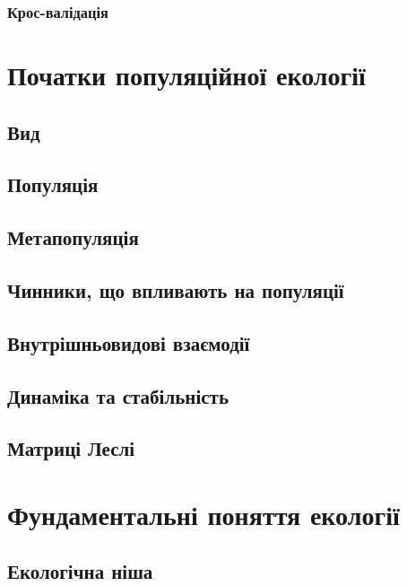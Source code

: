 \documentclass[
  11pt,
]{book}
\begin{document}
\subsection{Крос-валідація}\label{crossval}

\chapter{Початки популяційної екології}\label{popeco}

\section{Вид}\label{species}

\section{Популяція}\label{population}

\section{Метапопуляція}\label{metapopulation}

\section{Чинники, що впливають на популяції}\label{pop-factors}

\section{Внутрішньовидові взаємодії}\label{intraspecific}

\section{Динаміка та стабільність}\label{pop-dynamics}

\section{Матриці Леслі}\label{Leslie-matrix}

\chapter{Фундаментальні поняття екології}\label{foundations}

\section{Екологічна ніша}\label{niche}
\end{document}
